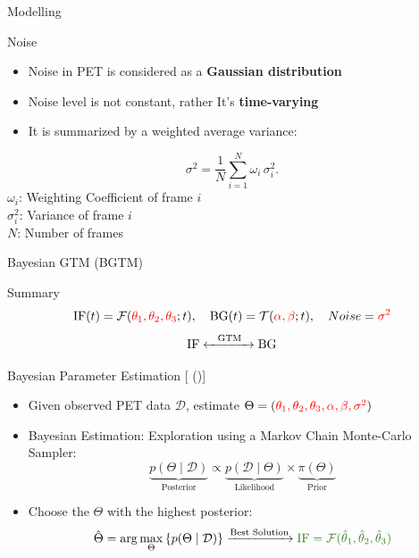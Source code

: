 \documentclass[aspectratio=169]{beamer}
\newcommand{\citeauthoryear}[1]{\citeauthor{#1} (\citeyear{#1})}
\begin{document}
\begin{frame}{Modelling}
	\begin{block}{Noise}
		\begin{itemize}
			\setlength\itemsep{1.5em}
			\item Noise in PET is considered as a \textbf{Gaussian distribution}
			\item Noise level is not constant, rather It's \textbf{time-varying}
			\item It is summarized by a weighted average variance:
		\end{itemize}
		\[
			\sigma^2 = \frac{1}{N} \sum_{i=1}^{N} \omega_i\,\sigma_i^2.
		\]
		\(\omega_i\): Weighting Coefficient of frame $i$\\[1.5em]
		\(\sigma_i^2\): Variance of frame $i$\\[1.5em]
		$N$: Number of frames
	\end{block}
\end{frame}



\begin{frame}[t]{Bayesian GTM (BGTM)}
	\begin{block}{Summary}
		\[
			\text{IF}(t) = \mathcal{F}(\textcolor{red}{\theta_1,\theta_2,\theta_3};t),
			\quad \text{BG}(t)=\mathcal{T}(\textcolor{red}{\alpha,\beta};t),
			\quad Noise=\textcolor{red}{\sigma^2}
		\]
		\[
			\text{IF} \xleftrightarrow{\text{\quad GTM\quad}} \text{BG}
		\]
	\end{block}
	\pause
	\begin{block}{Bayesian Parameter Estimation [\citeauthoryear{irace2021bayesian}]}
		\small
		\begin{itemize}
			\item<2-> Given observed PET data $\mathcal{D}$, estimate $\Theta=(\textcolor{red}{\theta_1, \theta_2, \theta_3, \alpha, \beta,\sigma^2})$
			\item<3-> Bayesian Estimation: Exploration using a Markov Chain Monte-Carlo Sampler:
			      \[
				      \underbrace{p(\Theta \mid \mathcal{D})}_{\text{Posterior}} \propto \underbrace{p(\mathcal{D} \mid \Theta)}_{\text{Likelihood}} \times \underbrace{\pi(\Theta)}_{\text{Prior}}
			      \]
			\item<4-> Choose the $\Theta$ with the highest posterior:
			      \[
				      \hat{\Theta} = \arg\max_{\Theta} \left\{ p(\Theta \mid \mathcal{D}) \right\}
				      \xrightarrow{\text{Best Solution}}
				      \textcolor{OliveGreen}{\text{IF} = \mathcal{F}(\hat{\theta}_1, \hat{\theta}_2, \hat{\theta}_3)}
			      \]
		\end{itemize}
	\end{block}
\end{frame}
\end{document}
